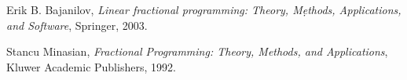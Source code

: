 \documentclass[12pt,a4paper]{report}
\begin{document}
\begin{thebibliography}{99}
	\thispagestyle{fancy}
	
	
	
	
	 Erik B. Bajanilov, {\it Linear fractional programming: Theory, Mẹthods, Applications, and Software}, Springer, 2003.
		
	 Stancu Minasian, {\it Fractional Programming: Theory, Methods, and Applications}, Kluwer Academic Publishers, 1992.
	

	
	
\end{thebibliography}
\end{document}
